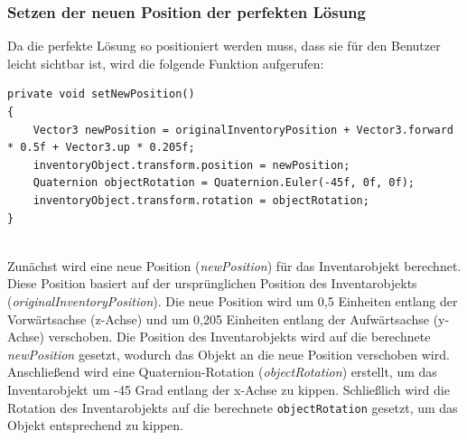 \subsubsection{Setzen der neuen Position der perfekten Lösung}
Da die perfekte Lösung so positioniert werden muss, dass sie für den Benutzer leicht sichtbar ist, wird die folgende
Funktion aufgerufen:
\begin{lstlisting}[style=csharp, caption={Neue Position setzen}, label=code:newPos_PSV]
private void setNewPosition()
{
    Vector3 newPosition = originalInventoryPosition + Vector3.forward * 0.5f + Vector3.up * 0.205f;
    inventoryObject.transform.position = newPosition;
    Quaternion objectRotation = Quaternion.Euler(-45f, 0f, 0f);
    inventoryObject.transform.rotation = objectRotation;
}
\end{lstlisting}\\
Zunächst wird eine neue Position (\textit{newPosition}) für das Inventarobjekt berechnet. Diese Position basiert auf der
ursprünglichen Position des Inventarobjekts (\textit{originalInventoryPosition}). Die neue Position wird um 0,5 Einheiten
entlang der Vorwärtsachse (z-Achse) und um 0,205 Einheiten entlang der Aufwärtsachse (y-Achse) verschoben. Die Position
des Inventarobjekts wird auf die berechnete \textit{newPosition} gesetzt, wodurch das Objekt an die neue Position verschoben
wird. Anschließend wird eine Quaternion-Rotation (\textit{objectRotation}) erstellt, um das Inventarobjekt um -45 Grad
entlang der x-Achse zu kippen. Schließlich wird die Rotation des Inventarobjekts auf die berechnete \texttt{objectRotation}
gesetzt, um das Objekt entsprechend zu kippen.

